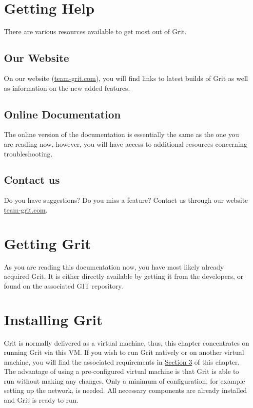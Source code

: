 \documentclass[10pt,a4paper, titlepage, toc=idx]{scrreprt}
\theoremstyle{definition}
\theoremstyle{plain}
\newcommand*{\product}{Grit}
\begin{document}
\chapter{Getting Help}
There are various resources available to get most out of \product.
\section{Our Website}
On our website (\url{team-grit.com}), you will find links to latest
builds of \product{} as well as information on the new added features.
\section{Online Documentation}
The online version of the documentation is essentially the same as the
one you are reading now, however, you will have access to additional
resources concerning troubleshooting.
\section{Contact us}
Do you have suggestions? Do you miss a feature? Contact us through our
website \url{team-grit.com}.
\chapter{Getting \product}
As you are reading this documentation now, you have most likely
already acquired \product. It is either directly available by getting
it from the developers, or found on the associated GIT repository.
\chapter{Installing \product}
\product{} is normally delivered as a virtual machine, thus, this
chapter concentrates on running \product{} via this VM. If you wish to
run \product{} natively or on another virtual machine, you will find the
associated requirements
in \hyperref[4.3]{Section 3} of this chapter.\\
The advantage of using a pre-configured virtual machine is that
\product{} is able to run without making any changes. Only a minimum of
configuration, for example setting up the network, is needed. All
necessary components are already installed and \product{} is ready to
run.
\end{document}
